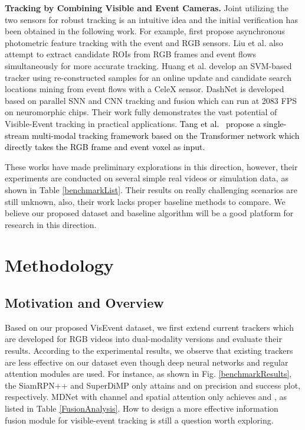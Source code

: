 \documentclass[journal]{IEEEtran}
\begin{document}
\noindent 
\textbf{Tracking by Combining Visible and Event Cameras.} 
Joint utilizing the two sensors for robust tracking is an intuitive idea and the initial verification has been obtained in the following work. For example, \cite{gehrig2018asynchronous, gehrig2020eklt} first propose asynchronous photometric feature tracking with the event and RGB sensors. Liu et al. \cite{liu2016combined} also attempt to extract candidate ROIs from RGB frames and event flows simultaneously for more accurate tracking. Huang et al. \cite{huang2018event} develop an SVM-based tracker using re-constructed samples for an online update and candidate search locations mining from event flows with a CeleX sensor. DashNet \cite{yang2019dashnet, zhao2022HNNframework} is developed based on parallel SNN and CNN tracking and fusion which can run at 2083 FPS on neuromorphic chips. Their work fully demonstrates the vast potential of Visible-Event tracking in practical applications. \textcolor{black}{Tang et al.~\cite{tang2022coesot} propose a single-stream multi-modal tracking framework based on the Transformer network which directly takes the RGB frame and event voxel as input.} 


These works have made preliminary explorations in this direction, however, their experiments are conducted on several simple real videos or simulation data, as shown in Table \ref{benchmarkList}. Their results on really challenging scenarios are still unknown, also, their work lacks proper baseline methods to compare. We believe our proposed dataset and baseline algorithm will be a good platform for research in this direction. 








\section{Methodology} 


\subsection{Motivation and Overview} \label{motivationView}
Based on our proposed VisEvent dataset, we first extend current trackers which are developed for RGB videos into dual-modality versions and evaluate their results. According to the experimental results, we observe that existing trackers are less effective on our dataset even though deep neural networks and regular attention modules are used. For instance, as shown in Fig. \ref{benchmarkResults}, the SiamRPN++ \cite{li2018siamrpn++} and SuperDiMP \cite{bhat2019DiMP} only attains  and  on precision and success plot, respectively. MDNet \cite{Nam2015Learning} with channel and spatial attention only achieves  and , as listed in Table \ref{FusionAnalysis}. How to design a more effective information fusion module for visible-event tracking is still a question worth exploring. 
\end{document}
